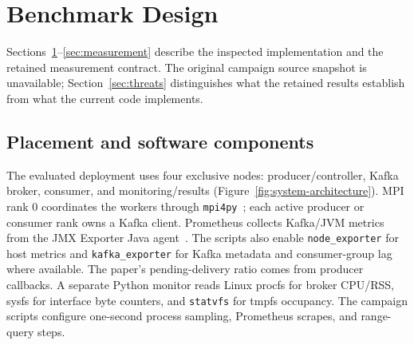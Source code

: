 \documentclass[10pt]{article}
\begin{document}
\section{Benchmark Design}
\label{sec:architecture}

Sections~\ref{sec:architecture}--\ref{sec:measurement} describe the inspected
implementation and the retained measurement contract.  The original campaign
source snapshot is unavailable; Section~\ref{sec:threats} distinguishes what
the retained results establish from what the current code implements.

\subsection{Placement and software components}

The evaluated deployment uses four exclusive nodes: producer/controller,
Kafka broker, consumer, and monitoring/results (Figure~\ref{fig:system-architecture}).
MPI rank 0 coordinates the workers through \texttt{mpi4py}~\cite{dalcin2021mpi4py};
each active producer or consumer rank owns a Kafka client.
Prometheus collects Kafka/JVM metrics from the JMX Exporter Java
agent~\cite{prometheus,kafkamonitoring}.  The scripts also enable
\texttt{node\_exporter} for host metrics and \texttt{kafka\_exporter} for Kafka
metadata and consumer-group lag where available.  The paper's pending-delivery
ratio comes from producer callbacks.  A separate Python monitor reads
Linux procfs for broker CPU/RSS, sysfs for interface byte counters, and
\texttt{statvfs} for tmpfs occupancy.  The campaign scripts configure one-second
process sampling, Prometheus scrapes, and range-query steps.
\end{document}
